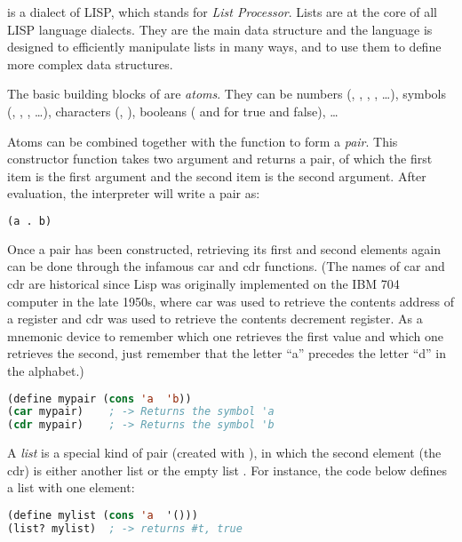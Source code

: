 \documentclass{../../../tp}
\begin{document}
\scheme is a dialect of LISP, which stands for \emph{List Processor}. Lists are at the core of all LISP language dialects. They are the main data structure and the language is designed to efficiently manipulate lists in many ways, and to use them to define more complex data structures.

The basic building blocks of \scheme are \emph{atoms}. They can be numbers (, , , , \ldots), symbols (, , , \ldots), characters (\schemecode{#\a}, \schemecode{#\Z}), booleans ( and  for true and false), \ldots 

Atoms can be combined together with the  function to form a \emph{pair}. This constructor function takes two argument and returns a pair, of which the first item is the first argument and the second item is the second argument. After evaluation, the \scheme interpreter will write a pair  as:

\begin{lstlisting}[language=lisp]
	(a . b)
\end{lstlisting}

Once a pair has been constructed, retrieving its first and second elements again can be done through the infamous car and cdr functions. (The names of car and cdr are historical since Lisp was originally implemented on the IBM 704 computer in the late 1950s, where car was used to retrieve the contents address of a register and cdr was used to retrieve the contents decrement register. As a mnemonic device to remember which one retrieves the first value and which one retrieves the second, just remember that the letter ``a'' precedes the letter ``d'' in the alphabet.)

\begin{lstlisting}[language=lisp]
(define mypair (cons 'a  'b))
(car mypair)	; -> Returns the symbol 'a
(cdr mypair)	; -> Returns the symbol 'b
\end{lstlisting}

A \emph{list} is a special kind of pair (created with ), in which the second element (the cdr) is either another list or the empty list . For instance, the code below defines a list with one element:

\begin{lstlisting}[language=lisp]
(define mylist (cons 'a  '()))
(list? mylist) 	; -> returns #t, true
\end{lstlisting}
\end{document}
